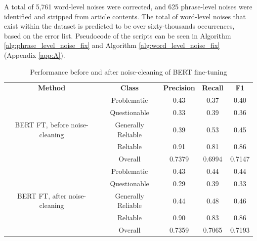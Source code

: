 A total of 5,761 word-level noises were corrected, and 625 phrase-level noises were identified and stripped from article contents. The total of word-level noises that exist within the dataset is predicted to be over sixty-thousands occurrences, based on the error list. Pseudocode of the scripts can be seen in Algorithm \ref{alg:phrase_level_noise_fix} and Algorithm \ref{alg:word_level_noise_fix} (Appendix \ref{app:A}).


\begin{table}[htbp]
    \centering
    \footnotesize
    \begin{tabular}{| c | c | c | c | c |}
        \hline                            \textbf{Method} & \textbf{Class}     & \textbf{Precision} & \textbf{Recall} & \textbf{F1} \\\cline{1-5}

        \multirow{5}{*}{BERT FT, before noise-cleaning}   & Problematic        & 0.43               & 0.37            & 0.40        \\
                                                          & Questionable       & 0.33               & 0.39            & 0.36        \\
                                                          & Generally Reliable & 0.39               & 0.53            & 0.45        \\
                                                          & Reliable           & 0.91               & 0.81            & 0.86        \\\cline{2-5}
                                                          & Overall            & 0.7379             & 0.6994          & 0.7147      \\
        \hline
        \multirow{5}{*}{BERT FT, after noise-cleaning}    & Problematic        & 0.43               & 0.44            & 0.44        \\
                                                          & Questionable       & 0.29               & 0.39            & 0.33        \\
                                                          & Generally Reliable & 0.44               & 0.48            & 0.46        \\
                                                          & Reliable           & 0.90               & 0.83            & 0.86        \\\cline{2-5}
                                                          & Overall            & 0.7359             & 0.7065          & 0.7193      \\
        \hline
    \end{tabular}
    \caption{Performance before and after noise-cleaning of BERT fine-tuning}
    \label{table:noise_performance_comparison}
\end{table}

